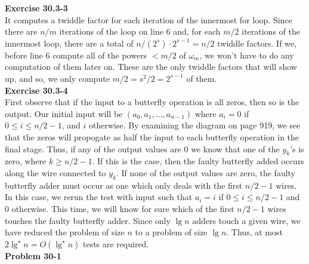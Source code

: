 \documentclass{article}
\begin{document}

\noindent\textbf{Exercise 30.3-3}\\

It computes a twiddle factor for each iteration of the innermost for loop. Since there are $n/m$ iterations of the loop on line 6 and, for each $m/2$ iterations of the innermost loop, there are a total of $n/(2^s)\cdot2^{s-1} =n/2$ twiddle factors. If we, before line 6 compute all of the powers $<m/2$ of $\omega_m$, we won't have to do any computation of them later on. These are the only twiddle factors that will show up, and so, we only compute $m/2 = s^2/2 = 2^{s-1}$ of them.\\

\noindent\textbf{Exercise 30.3-4}\\

First observe that if the input to a butterfly operation is all zeros, then so is the output.  Our initial input will be $(a_0,a_1,\ldots, a_{n-1})$ where $a_i = 0$ if $0 \leq i \leq n/2-1$, and $i$ otherwise.  By examining the diagram on page 919, we see that the zeros will propogate as half the input to each butterfly operation in the final stage. Thus, if any of the output values are 0 we know that one of the $y_k$'s is zero, where $k \geq n/2-1$.  If this is the case, then the faulty butterfly added occurs along the wire connected to $y_k$.  If none of the output values are zero, the faulty butterfly adder must occur as one which only deals with the first $n/2-1$ wires.  In this case, we rerun the test with input such that $a_i = i$ if $0 \leq i \leq n/2-1$ and 0 otherwise.  This time, we will know for sure which of the first $n/2-1$ wires touches the faulty butterfly adder.  Since only $\lg n$ adders touch a given wire, we have reduced the problem of size $n$ to a problem of size $\lg n$. Thus, at most $2\lg^\star n = O(\lg^\star n)$ tests are required. \\

\noindent\textbf{Problem 30-1}\\
\end{document}
